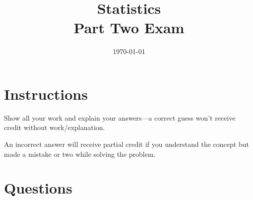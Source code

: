 \documentclass[landscape]{exam}
\title{Statistics \\ Part Two Exam}
\date{\today}
\author{}
\begin{document}
  \maketitle


  \ifprintanswers{}
  \else
    \section{Instructions}
    Show all your work and explain your answers---a correct guess won't receive
    credit without work/explanation. 
    
    An incorrect answer will receive partial credit if you understand the
    concept but made a mistake or two while solving the problem.
  \fi

  \section{Questions}
\end{document}
